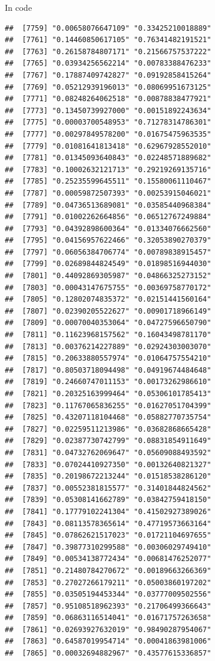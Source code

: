 \documentclass[ignorenonframetext,]{beamer}
\begin{document}
\begin{frame}[fragile]{In code}
\begin{verbatim}
##  [7759] "0.00658076647109" "0.33425210018889"
##  [7761] "0.14460850617105" "0.76341482191521"
##  [7763] "0.26158784807171" "0.21566757537222"
##  [7765] "0.03934256562214" "0.00783388476233"
##  [7767] "0.17887409742827" "0.09192858415264"
##  [7769] "0.05212939196013" "0.08069951673125"
##  [7771] "0.08248264062518" "0.00878838477921"
##  [7773] "0.13450739927000" "0.00151892243634"
##  [7775] "0.00003700548953" "0.71278314786301"
##  [7777] "0.00297849578200" "0.01675475963535"
##  [7779] "0.01081641813418" "0.62967928552010"
##  [7781] "0.01345093640843" "0.02248571889682"
##  [7783] "0.10002632121713" "0.29219269135716"
##  [7785] "0.25235599645511" "0.15580061110467"
##  [7787] "0.00059872507393" "0.00253915046021"
##  [7789] "0.04736513689081" "0.03585440968384"
##  [7791] "0.01002262664856" "0.06512767249884"
##  [7793] "0.04392898600364" "0.01334076662560"
##  [7795] "0.04156957622466" "0.32053890270379"
##  [7797] "0.06056384706774" "0.00789838915457"
##  [7799] "0.02689844824549" "0.01898516944030"
##  [7801] "0.44092869305987" "0.04866325273152"
##  [7803] "0.00043147675755" "0.00369758770172"
##  [7805] "0.12802074835372" "0.02151441560164"
##  [7807] "0.02390205522627" "0.00901718966149"
##  [7809] "0.00070040353064" "0.04727596650790"
##  [7811] "0.11623968157562" "0.16043498781170"
##  [7813] "0.00376214227889" "0.02924303003070"
##  [7815] "0.20633880557974" "0.01064757554210"
##  [7817] "0.80503718094498" "0.04919674484648"
##  [7819] "0.24660747011153" "0.00173262986610"
##  [7821] "0.20325163999464" "0.05306101785413"
##  [7823] "0.11767065836255" "0.01627051704399"
##  [7825] "0.43207118104468" "0.05882770735754"
##  [7827] "0.02259511213986" "0.03682868665428"
##  [7829] "0.02387730742799" "0.08831854911649"
##  [7831] "0.04732762069647" "0.05609088493592"
##  [7833] "0.07024410927350" "0.00132640821327"
##  [7835] "0.20198672213244" "0.01518538286120"
##  [7837] "0.00552381815577" "0.31401844824562"
##  [7839] "0.05308141662789" "0.03842759418150"
##  [7841] "0.17779102241304" "0.41502927389026"
##  [7843] "0.08113578365614" "0.47719573663164"
##  [7845] "0.07862621517023" "0.01721104697655"
##  [7847] "0.39877310299588" "0.00306029749410"
##  [7849] "0.00534138772434" "0.00681476252077"
##  [7851] "0.21480784270672" "0.00189663266369"
##  [7853] "0.27027266179211" "0.05003860197202"
##  [7855] "0.03505194453344" "0.03777009502556"
##  [7857] "0.95108518962393" "0.21706499366643"
##  [7859] "0.06863116514041" "0.01671757263658"
##  [7861] "0.02693927632019" "0.98490287954067"
##  [7863] "0.64587019954714" "0.00041863981006"
##  [7865] "0.00032694882967" "0.43577615336857"

\end{verbatim}
\end{frame}
\end{document}
